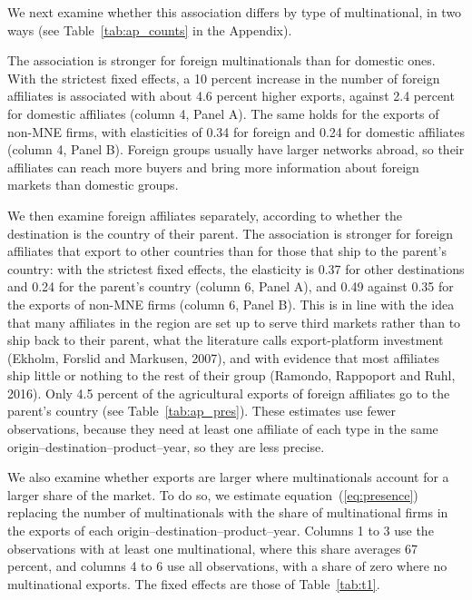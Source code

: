 \documentclass[11pt,a4paper]{article}
\begin{document}
We next examine whether this association differs by type of multinational, in two ways (see
Table~\ref{tab:ap_counts} in the Appendix).

The association is stronger for foreign multinationals
than for domestic ones. With the strictest fixed effects, a 10 percent increase in the number of
foreign affiliates is associated with about 4.6 percent higher exports, against 2.4 percent for
domestic affiliates (column 4, Panel A). The same holds for the exports of non-MNE firms, with
elasticities of 0.34 for foreign and 0.24 for domestic affiliates (column 4, Panel B). Foreign
groups usually have larger networks abroad, so their affiliates can reach more buyers and bring
more information about foreign markets than domestic groups.

We then examine foreign affiliates separately,
according to whether the destination is the country of their parent. The association is stronger for foreign affiliates
that export to other countries than for those that ship to the parent's country: with the
strictest fixed effects, the elasticity is 0.37 for other destinations and 0.24 for the parent's
country (column 6, Panel A), and 0.49 against 0.35 for the exports of non-MNE firms (column 6, Panel
B). This is in line with the idea that many affiliates in the region are set up to serve third
markets rather than to ship back to their parent, what the literature calls export-platform
investment (Ekholm, Forslid and Markusen, 2007), and with evidence that most affiliates ship little
or nothing to the rest of their group (Ramondo, Rappoport and Ruhl, 2016). Only 4.5 percent of the
agricultural exports of foreign affiliates go to the parent's country (see
Table~\ref{tab:ap_pres}). These estimates use fewer observations, because they need at least one
affiliate of each type in the same origin--destination--product--year, so they are less precise.

We also examine whether exports are larger where multinationals account for a larger share of the
market. To do so, we estimate equation~(\ref{eq:presence}) replacing the number of multinationals with
the share of multinational firms in the exports of each origin--destination--product--year. Columns
1 to 3 use the observations with at least one multinational, where this share averages 67 percent,
and columns 4 to 6 use all observations, with a share of zero where no multinational exports. The
fixed effects are those of Table~\ref{tab:t1}.
\end{document}
